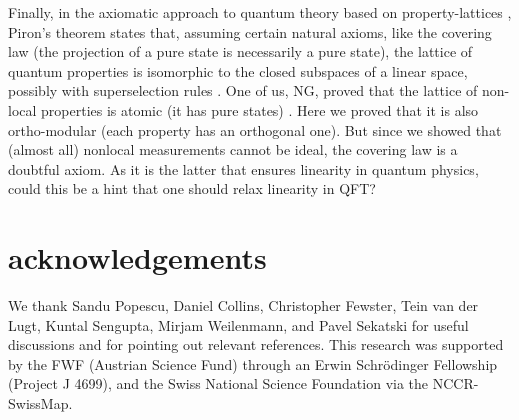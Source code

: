 \documentclass[12pt]{article}
\begin{document}
Finally, in the axiomatic approach to quantum theory based on property-lattices \cite{jauch1969structure}, Piron’s theorem states that, assuming certain natural axioms, like the covering law (the projection of a pure state is necessarily a pure state), the lattice of quantum properties is isomorphic to the closed subspaces of a linear space, possibly with superselection rules \cite{piron1964axiomatique}. One of us, NG, proved that the lattice of non-local properties is atomic (it has pure states) \cite{gisin1986property}. Here we proved that it is also ortho-modular (each property has an orthogonal one). But since we showed that (almost all) nonlocal measurements cannot be ideal, the covering law is a doubtful axiom. As it is the latter that ensures linearity in quantum physics, could this be a hint that one should relax linearity in QFT?



\section{acknowledgements}
We thank Sandu Popescu, Daniel Collins, 
Christopher Fewster, Tein van der Lugt, Kuntal Sengupta, Mirjam Weilenmann, and Pavel Sekatski for useful discussions and for pointing out relevant references. 
This research was supported by the FWF (Austrian Science Fund) through an Erwin Schr\"odinger Fellowship (Project J 4699), and the Swiss National Science Foundation via the NCCR-SwissMap.



\end{document}
